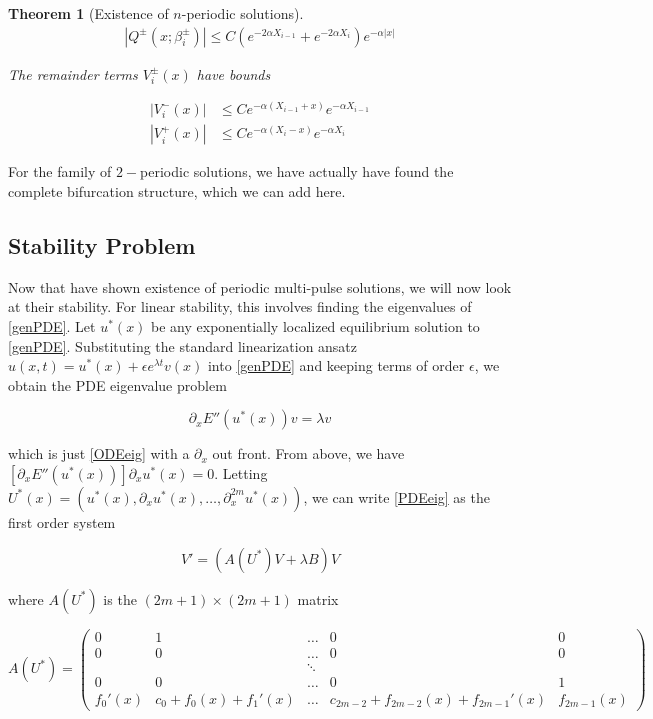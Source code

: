 \documentclass[12pt]{article}
\newtheorem{theorem}{Theorem}
\begin{document}
\begin{theorem}[Existence of $n$-periodic solutions]
\begin{align*}
|Q^\pm(x; \beta_i^\pm)| \leq C (e^{-2 \alpha X_{i-1}} + e^{-2 \alpha X_i})e^{-\alpha |x|}
\end{align*} 

The remainder terms $V_i^\pm(x)$ have bounds

\begin{align}
|V_i^-(x)| &\leq C e^{-\alpha(X_{i-1} + x)}e^{-\alpha X_{i-1}} \\
|V_i^+(x)| &\leq C e^{-\alpha(X_i - x)}e^{-\alpha X_i} 
\end{align} 
\end{theorem}

For the family of $2-$periodic solutions, we have actually have found the complete bifurcation structure, which we can add here.

\subsection{Stability Problem}

Now that have shown existence of periodic multi-pulse solutions, we will now look at their stability. For linear stability, this involves finding the eigenvalues of \eqref{genPDE}. Let $u^*(x)$ be any exponentially localized equilibrium solution to \eqref{genPDE}. Substituting the standard linearization ansatz $u(x, t) = u^*(x) + \epsilon e^{\lambda t}v(x)$ into \eqref{genPDE} and keeping terms of order $\epsilon$, we obtain the PDE eigenvalue problem

\begin{equation}\label{PDEeig}
\partial_x E''(u^*(x)) v = \lambda v
\end{equation}

which is just \eqref{ODEeig} with a $\partial_x$ out front. From above, we have $[\partial_x E''(u^*(x))] \partial_x u^*(x) = 0$. Letting $U^*(x) = (u^*(x), \partial_x u^*(x), \dots, \partial_x^{2m}u^*(x))$, we can write \eqref{PDEeig} as the first order system 

\begin{equation}\label{PDEeig2}
V' = ( A(U^*)V + \lambda B)V 
\end{equation}

where $A(U^*)$ is the $(2m+1) \times (2m+1)$ matrix

\begin{equation}\label{DefA}
A(U^*) = \begin{pmatrix}
0 & 1 & \dots & 0 & 0 \\
0 & 0 & \dots & 0 & 0 \\
& & \ddots  \\
0 & 0 & \dots & 0 & 1 \\
f_0'(x) & c_0 + f_0(x) + f_1'(x) & \dots & c_{2m-2} + f_{2m-2}(x) + f_{2m-1}' (x) & f_{2m-1}(x)
\end{pmatrix}
\end{equation}
\end{document}
